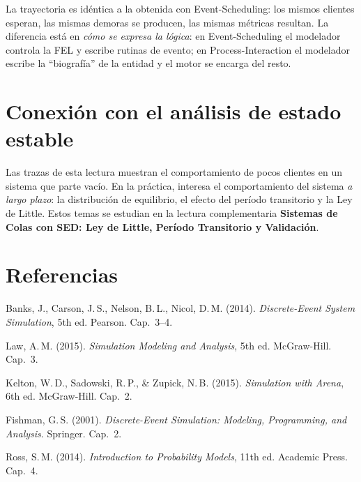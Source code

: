 \documentclass[11pt, letterpaper]{article}
\begin{document}
La trayectoria es idéntica a la obtenida con Event-Scheduling: los mismos clientes esperan, las mismas demoras se producen, las mismas métricas resultan. La diferencia está en \emph{cómo se expresa la lógica}: en Event-Scheduling el modelador controla la FEL y escribe rutinas de evento; en Process-Interaction el modelador escribe la ``biografía'' de la entidad y el motor se encarga del resto.


\section{Conexión con el análisis de estado estable}

Las trazas de esta lectura muestran el comportamiento de pocos clientes en un sistema que parte vacío. En la práctica, interesa el comportamiento del sistema \emph{a largo plazo}: la distribución de equilibrio, el efecto del período transitorio y la Ley de Little. Estos temas se estudian en la lectura complementaria \textbf{Sistemas de Colas con SED: Ley de Little, Período Transitorio y Validación}.

\vfill

\section*{Referencias}

\begin{enumerate}[label={[\arabic*]}]
    \item Banks, J., Carson, J.\,S., Nelson, B.\,L., Nicol, D.\,M. (2014). \textit{Discrete-Event System Simulation}, 5th ed. Pearson. Cap.~3--4.
    \item Law, A.\,M. (2015). \textit{Simulation Modeling and Analysis}, 5th ed. McGraw-Hill. Cap.~3.
    \item Kelton, W.\,D., Sadowski, R.\,P., \& Zupick, N.\,B. (2015). \textit{Simulation with Arena}, 6th ed. McGraw-Hill. Cap.~2.
    \item Fishman, G.\,S. (2001). \textit{Discrete-Event Simulation: Modeling, Programming, and Analysis}. Springer. Cap.~2.
    \item Ross, S.\,M. (2014). \textit{Introduction to Probability Models}, 11th ed. Academic Press. Cap.~4.
\end{enumerate}
\end{document}
